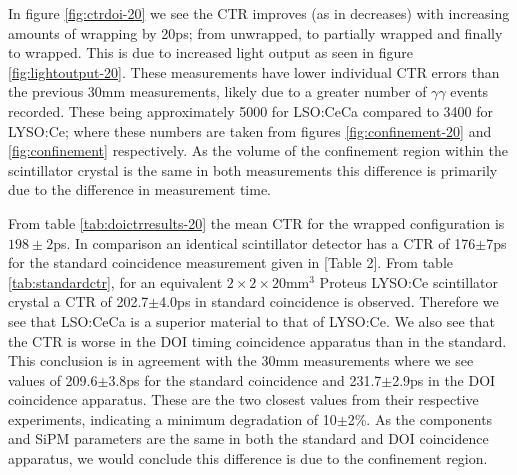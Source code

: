 In figure \ref{fig:ctrdoi-20} we see the CTR improves (as in decreases) with increasing amounts of wrapping by 20ps; from unwrapped, to partially wrapped and finally to wrapped. This is due to increased light output as seen in figure \ref{fig:lightoutput-20}. These measurements have lower individual CTR errors than the previous 30mm measurements, likely due to a greater number of $\gamma\gamma$ events recorded. These being approximately 5000 for LSO:CeCa compared to 3400 for LYSO:Ce; where these numbers are taken from figures \ref{fig:confinement-20} and \ref{fig:confinement} respectively. As the volume of the confinement region within the scintillator crystal is the same in both measurements this difference is primarily due to the difference in measurement time. 


From table \ref{tab:doictrresults-20} the mean CTR for the wrapped configuration is $198\pm2$ps. In comparison an identical scintillator detector has a CTR of 176$\pm$7ps for the standard coincidence measurement given in [Table 2]\cite{uffray_Jarron_Meyer_Lecoq_2014}. From table \ref{tab:standardctr}, for an equivalent $2\times2\times20$mm$^3$ Proteus LYSO:Ce scintillator crystal a CTR of 202.7$\pm$4.0ps in standard coincidence is observed. Therefore we see that LSO:CeCa is a superior material to that of LYSO:Ce. We also see that the CTR is worse in the DOI timing coincidence apparatus than in the standard. This conclusion is in agreement with the 30mm measurements where we see values of 209.6$\pm$3.8ps for the standard coincidence and 231.7$\pm$2.9ps in the DOI coincidence apparatus. These are the two closest values from their respective experiments, indicating a minimum degradation of 10$\pm$2\%. As the components and SiPM parameters are the same in both the standard and DOI coincidence apparatus, we would conclude this difference is due to the confinement region.